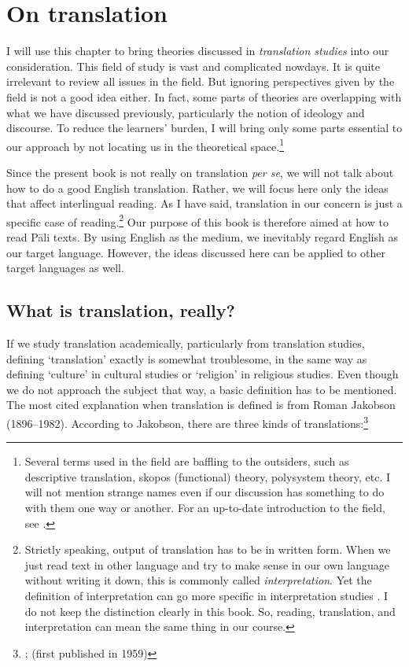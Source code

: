 \chapter{On translation}\label{chap:translation}

I will use this chapter to bring theories discussed in \emph{translation studies} into our consideration. This field of study is vast and complicated nowdays. It is quite irrelevant to review all issues in the field. But ignoring perspectives given by the field is not a good idea either. In fact, some parts of theories are overlapping with what we have discussed previously, particularly the notion of ideology and discourse. To reduce the learners' burden, I will bring only some parts essential to our approach by not locating us in the theoretical space.\footnote{Several terms used in the field are baffling to the outsiders, such as descriptive translation, skopos (functional) theory, polysystem theory, etc. I will not mention strange names even if our discussion has something to do with them one way or another. For an up-to-date introduction to the field, see \citealp{munday:translation}.}

Since the present book is not really on translation \textit{per se}, we will not talk about how to do a good English translation. Rather, we will focus here only the ideas that affect interlingual reading. As I have said, translation in our concern is just a specific case of reading.\footnote{Strictly speaking, output of translation has to be in written form. When we just read text in other language and try to make sense in our own language without writing it down, this is commonly called \emph{interpretation}. Yet the definition of interpretation can go more specific in interpretation studies \citep[see][p.~8]{munday:translation}. I do not keep the distinction clearly in this book. So, reading, translation, and interpretation can mean the same thing in our course.} Our purpose of this book is therefore aimed at how to read P\=ali texts. By using English as the medium, we inevitably regard English as our target language. However, the ideas discussed here can be applied to other target languages as well.

\section*{What is translation, really?}

If we study translation academically, particularly from translation studies, defining `translation' exactly is somewhat troublesome, in the same way as defining `culture' in cultural studies or `religion' in religious studies. Even though we do not approach the subject that way, a basic definition has to be mentioned. The most cited explanation when translation is defined is from Roman Jakobson (1896--1982). According to Jakobson, there are three kinds of translations:\footnote{\citealp[p.~261]{jakobson:selected2}; \citealp[p.~127]{jakobson:translation} (first published in 1959)}

